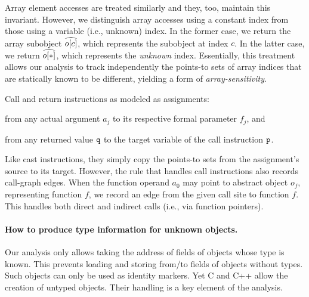 Array element accesses are treated similarly and they, too, maintain
this invariant. However, we distinguish array accesses using a
constant index from those using a variable (i.e., unknown)
index. In the former case, we return the array subobject
$\widehat{o[c]}$, which represents the subobject at index
$c$. In the latter case, we return $\widehat{o[*]}$, which represents
the \emph{unknown} index. Essentially, this treatment allows our
analysis to track independently the points-to sets of array indices that are
statically known to be different, yielding a form of
\emph{array-sensitivity}.

Call and return instructions as modeled as assignments:
\begin{inparaenum}[(i)]
\item from any actual argument $a_j$ to its respective formal
  parameter $f_j$, and
\item from any returned value $\texttt{q}$ to the target variable of the
  call instruction $\texttt{p}$.
\end{inparaenum}
Like cast instructions, they simply copy the points-to sets from the
assignment's source to its target. However, the rule that handles call
instructions also records call-graph edges. When the function operand
$a_0$ may point to abstract object $o_f$, representing function $f$,
we record an edge from the given call site to function $f$. This
handles both direct and indirect calls (i.e., via function pointers).

\paragraph{How to produce type information for unknown objects.}
Our analysis only allows taking the address of fields of objects 
whose type is known. This prevents loading and storing from/to fields
of objects without types. Such objects can only be used as identity
markers. Yet C and C++ allow the creation of untyped objects. Their handling
is a key element of the analysis.

